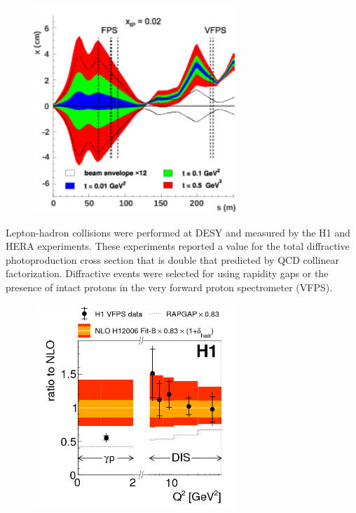 \begin{figure}[h!]
\begin{centering}
\includegraphics[width=3in]{Chapter2/importfigs/fig7_h1_2015.png}
\par\end{centering}
\end{figure}

Lepton-hadron collisions were performed at DESY and measured by the H1 and HERA experiments. These experiments reported a value for the total diffractive photoproduction cross section that is double that predicted by QCD collinear factorization. Diffractive events were selected for using rapidity gaps or the presence of intact protons in the very forward proton spectrometer (VFPS). 

\begin{figure}[h!]
\begin{centering}
\includegraphics[width=3in]{Chapter2/importfigs/fig8_h1_2015.png}
\par\end{centering}
\end{figure}
